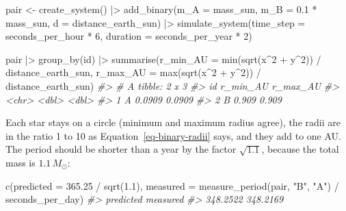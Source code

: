 \documentclass[
  10.5pt,
  letterpaper,
]{scrbook}
\newenvironment{Shaded}{\begin{snugshade}}{\end{snugshade}}
\newcommand{\AttributeTok}[1]{\textcolor[rgb]{0.00,0.00,0.00}{#1}}
\newcommand{\CommentTok}[1]{\textcolor[rgb]{0.00,0.00,0.00}{\textit{#1}}}
\newcommand{\DecValTok}[1]{\textcolor[rgb]{0.00,0.00,0.00}{#1}}
\newcommand{\FloatTok}[1]{\textcolor[rgb]{0.00,0.00,0.00}{#1}}
\newcommand{\FunctionTok}[1]{\textcolor[rgb]{0.00,0.00,0.00}{#1}}
\newcommand{\NormalTok}[1]{\textcolor[rgb]{0.00,0.00,0.00}{#1}}
\newcommand{\OtherTok}[1]{\textcolor[rgb]{0.00,0.00,0.00}{#1}}
\newcommand{\SpecialCharTok}[1]{\textcolor[rgb]{0.00,0.00,0.00}{#1}}
\newcommand{\StringTok}[1]{\textcolor[rgb]{0.00,0.00,0.00}{#1}}
\theoremstyle{definition}
\theoremstyle{plain}
\theoremstyle{remark}
\begin{document}
\begin{Shaded}
\begin{Highlighting}[]
\NormalTok{pair }\OtherTok{\textless{}{-}} \FunctionTok{create\_system}\NormalTok{() }\SpecialCharTok{|\textgreater{}}
  \FunctionTok{add\_binary}\NormalTok{(}\AttributeTok{m\_A =}\NormalTok{ mass\_sun, }\AttributeTok{m\_B =} \FloatTok{0.1} \SpecialCharTok{*}\NormalTok{ mass\_sun, }\AttributeTok{d =}\NormalTok{ distance\_earth\_sun) }\SpecialCharTok{|\textgreater{}}
  \FunctionTok{simulate\_system}\NormalTok{(}\AttributeTok{time\_step =}\NormalTok{ seconds\_per\_hour }\SpecialCharTok{*} \DecValTok{6}\NormalTok{, }\AttributeTok{duration =}\NormalTok{ seconds\_per\_year }\SpecialCharTok{*} \DecValTok{2}\NormalTok{)}

\NormalTok{pair }\SpecialCharTok{|\textgreater{}}
  \FunctionTok{group\_by}\NormalTok{(id) }\SpecialCharTok{|\textgreater{}}
  \FunctionTok{summarise}\NormalTok{(}\AttributeTok{r\_min\_AU =} \FunctionTok{min}\NormalTok{(}\FunctionTok{sqrt}\NormalTok{(x}\SpecialCharTok{\^{}}\DecValTok{2} \SpecialCharTok{+}\NormalTok{ y}\SpecialCharTok{\^{}}\DecValTok{2}\NormalTok{)) }\SpecialCharTok{/}\NormalTok{ distance\_earth\_sun,}
            \AttributeTok{r\_max\_AU =} \FunctionTok{max}\NormalTok{(}\FunctionTok{sqrt}\NormalTok{(x}\SpecialCharTok{\^{}}\DecValTok{2} \SpecialCharTok{+}\NormalTok{ y}\SpecialCharTok{\^{}}\DecValTok{2}\NormalTok{)) }\SpecialCharTok{/}\NormalTok{ distance\_earth\_sun)}
\CommentTok{\#\textgreater{} \# A tibble: 2 x 3}
\CommentTok{\#\textgreater{}   id    r\_min\_AU r\_max\_AU}
\CommentTok{\#\textgreater{}   \textless{}chr\textgreater{}    \textless{}dbl\textgreater{}    \textless{}dbl\textgreater{}}
\CommentTok{\#\textgreater{} 1 A       0.0909   0.0909}
\CommentTok{\#\textgreater{} 2 B       0.909    0.909}
\end{Highlighting}
\end{Shaded}

Each star stays on a circle (minimum and maximum radius agree), the
radii are in the ratio 1 to 10 as Equation~\ref{eq-binary-radii} says,
and they add to one AU. The period should be shorter than a year by the
factor \(\sqrt{1.1}\), because the total mass is \(1.1\,M_\odot\):

\begin{Shaded}
\begin{Highlighting}[]
\FunctionTok{c}\NormalTok{(}\AttributeTok{predicted =} \FloatTok{365.25} \SpecialCharTok{/} \FunctionTok{sqrt}\NormalTok{(}\FloatTok{1.1}\NormalTok{),}
  \AttributeTok{measured  =} \FunctionTok{measure\_period}\NormalTok{(pair, }\StringTok{"B"}\NormalTok{, }\StringTok{"A"}\NormalTok{) }\SpecialCharTok{/}\NormalTok{ seconds\_per\_day)}
\CommentTok{\#\textgreater{} predicted  measured }
\CommentTok{\#\textgreater{}  348.2522  348.2169}
\end{Highlighting}
\end{Shaded}
\end{document}

